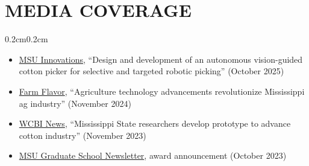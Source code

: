 \documentclass[10pt, letterpaper]{article}
\newenvironment{highlights}{%
    \begin{itemize}[topsep=0.08cm, parsep=0.08cm, partopsep=0pt,
                    itemsep=0pt, leftmargin=0.4cm + 10pt]
}{\end{itemize}}
\newenvironment{onecolentry}{%
    \begin{adjustwidth}{0.2cm}{0.2cm}
}{\end{adjustwidth}}
\begin{document}
\section{MEDIA COVERAGE}
\vspace{0.08cm}
\begin{onecolentry}
    \begin{highlights}
        \item \href{https://msstate-innovations.technologypublisher.com/technology/58899}{MSU
              Innovations}, ``Design and development of an autonomous vision-guided
              cotton picker for selective and targeted robotic picking''
              (October 2025)
        \item \href{https://farmflavor.com/mississippi/mississippi-technology/agriculture-technology-advancements-revolutionize-mississippi-ag-industry/}{Farm
              Flavor}, ``Agriculture technology advancements revolutionize
              Mississippi ag industry'' (November 2024)
        \item \href{https://www.wcbi.com/mississippi-state-researchers-develop-prototype-to-advance-cotton-industry/}{WCBI
              News}, ``Mississippi State researchers develop prototype to advance
              cotton industry'' (November 2023)
        \item \href{https://issuu.com/gradmarketing/docs/newsletter_-_ragged/40}{MSU
              Graduate School Newsletter}, award announcement (October 2023)
    \end{highlights}
\end{onecolentry}
\vspace{0.18cm}

%
\end{document}
